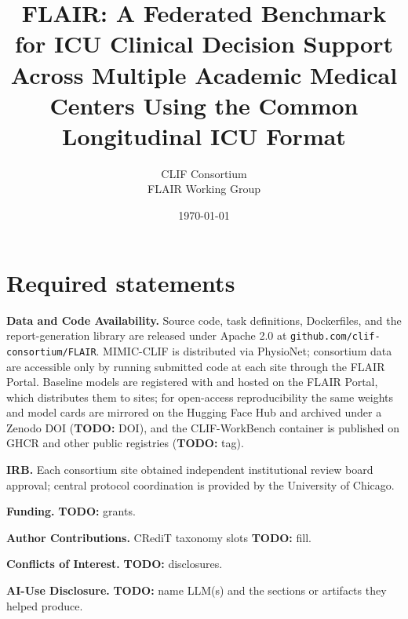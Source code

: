 \documentclass[11pt]{article}
\title{\textbf{FLAIR: A Federated Benchmark for ICU Clinical Decision
Support Across Multiple Academic Medical Centers Using the Common Longitudinal
ICU Format}}
\author{CLIF Consortium \\ FLAIR Working Group}
\date{\today}
\newcommand{\todo}[1]{{\color{red}\textbf{TODO:} #1}}
\begin{document}
\maketitle

















\section*{Required statements}
\noindent\textbf{Data and Code Availability.} Source code, task
definitions, Dockerfiles, and the report-generation library are
released under Apache 2.0 at \texttt{github.com/clif-consortium/FLAIR}.
MIMIC-CLIF is distributed via PhysioNet; consortium data are accessible
only by running submitted code at each site through the FLAIR Portal.
Baseline models are registered with and hosted on the FLAIR Portal,
which distributes them to sites; for open-access reproducibility the
same weights and model cards are mirrored on the Hugging Face Hub and
archived under a Zenodo DOI (\todo{DOI}), and the CLIF-WorkBench
container is published on GHCR and other public registries
(\todo{tag}).

\noindent\textbf{IRB.} Each consortium site obtained independent
institutional review board approval; central protocol coordination is
provided by the University of Chicago.

\noindent\textbf{Funding.} \todo{grants}.

\noindent\textbf{Author Contributions.} CRediT taxonomy slots \todo{fill}.

\noindent\textbf{Conflicts of Interest.} \todo{disclosures}.

\noindent\textbf{AI-Use Disclosure.} \todo{name LLM(s) and the sections
or artifacts they helped produce}.




\appendix

\end{document}
